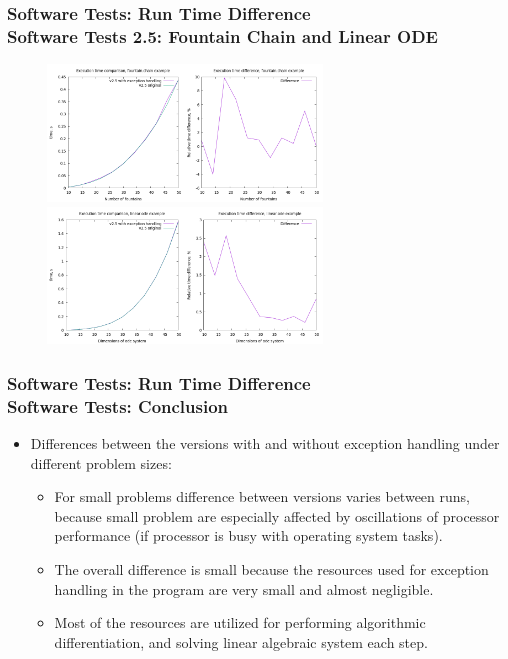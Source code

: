 \documentclass[ucs,10pt]{beamer}
\begin{document}
\begin{frame}
\frametitle{Software Tests: Run Time Difference \\
	\small \color{rwth-blue} Software Tests 2.5: Fountain Chain and Linear ODE}
	\begin{figure}
		\centering
		\includegraphics[width=0.65\textwidth]{figures/2.5_fountain_chain.png}
		\vspace{0.3cm}
		\includegraphics[width=0.65\textwidth]{figures/2.5_linear_ode.png}
	\end{figure}
\end{frame}
	
\begin{frame}
\frametitle{Software Tests: Run Time Difference \\
	\small \color{rwth-blue} Software Tests: Conclusion}
	\begin{itemize}
		\item Differences between the versions with and without exception handling under different problem sizes:
		\begin{itemize}
			\item For small problems difference between versions varies between runs, because small problem are especially affected by oscillations of processor performance (if processor is busy with operating system tasks).
			\item The overall difference is small because the resources used for exception handling in the program are very small and almost negligible. 
			\item Most of the resources are utilized for performing algorithmic differentiation, and solving linear algebraic system each step.
		\end{itemize}
	\end{itemize}
\end{frame}
			
\end{document}
